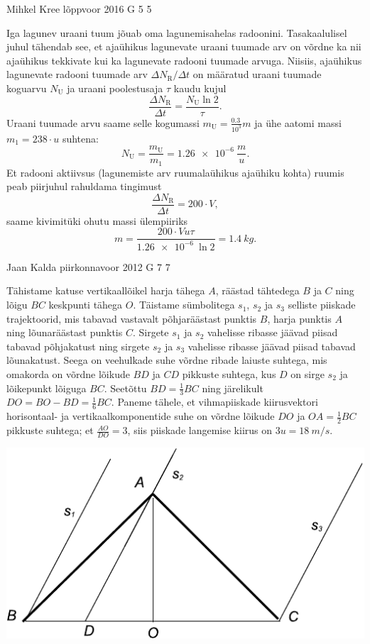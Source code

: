 \documentclass[11pt, twoside]{article}
\begin{document}
{%
{Mihkel Kree} %
{lõppvoor} %
{2016} %
{G 5} %
{5} %
{

\ifSolution
Iga lagunev uraani tuum jõuab oma lagunemisahelas radoonini. Tasakaalulisel juhul tähendab see, et ajaühikus lagunevate uraani tuumade arv on võrdne ka nii ajaühikus tekkivate kui ka lagunevate radooni tuumade arvuga. Niisiis, ajaühikus lagunevate radooni tuumade arv $\Delta N_\text{R} / \Delta t$ on määratud uraani tuumade koguarvu $N_\text{U}$ ja uraani poolestusaja $\tau$ kaudu kujul
\[
\frac{\Delta N_\text{R}}{\Delta t} = \frac{N_\text{U} \ln 2}{\tau}.
\]
Uraani tuumade arvu saame selle kogumassi $m_\text{U} = \frac{\SI{0.3}{}}{10^3} m$ ja ühe aatomi massi $m_1=238 \cdot u$ suhtena:
\[
N_\text{U}=\frac{m_\text{U}}{m_1}=\SI{1.26e-6}{} \frac{m}{u}.
\]
Et radooni aktiivsus (lagunemiste arv ruumalaühikus ajaühiku kohta) ruumis peab piirjuhul rahuldama tingimust
\[
\frac{\Delta N_\text{R}}{\Delta t} = 200\cdot V,
\]
saame kivimitüki ohutu massi ülempiiriks
\[
m = \frac{200\cdot V u \tau}{\SI{1.26e-6}{}\ln 2}=\SI{1.4}{kg}.
\]
\fi
}

{Jaan Kalda} %
{piirkonnavoor} %
{2012} %
{G 7} %
{7} %
{

\ifSolution
Tähistame katuse vertikaallõikel harja tähega $A$, räästad tähtedega $B$ ja $C$ ning lõigu $BC$ keskpunti tähega $O$. 
Täistame sümbolitega $s_1$, $s_2$ ja $s_3$ selliste piiskade trajektoorid, mis tabavad vastavalt põhjaräästast punktis $B$, harja punktis $A$ ning  lõunaräästast punktis $C$. Sirgete $s_1$ ja $s_2$ vahelisse ribasse jäävad piisad tabavad põhjakatust ning sirgete $s_2$ ja $s_3$ vahelisse ribasse jäävad 
piisad tabavad lõunakatust. Seega on veehulkade suhe võrdne ribade laiuste suhtega, mis omakorda on võrdne lõikude $BD$ ja $CD$ pikkuste suhtega, kus $D$ on sirge $s_2$ ja lõikepunkt lõiguga $BC$. Seetõttu $BD=\frac 13 BC$ ning järelikult $DO=BO-BD=\frac 16 BC$. Paneme tähele, et vihmapiiskade 
kiirusvektori horisontaal- ja vertikaalkomponentide suhe on võrdne lõikude $DO$ ja $OA=\frac 12 BC$ pikkuste suhtega; et $\frac {AO}{DO}=3$, siis piiskade 
langemise kiirus on $3u=\SI{18}{m/s}$.

\begin{center}
\includegraphics[width=0.5\linewidth]{2012-v2g-07-katus}
\end{center}
\fi
}

}
\end{document}
